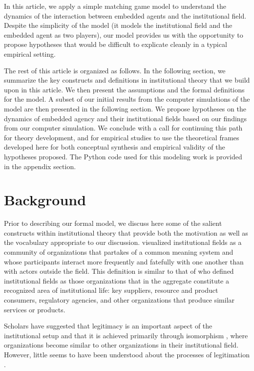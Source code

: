 \documentclass[12pt,letterpaper]{article}
\begin{document}
In this article, we apply a simple matching game model to  understand the dynamics of the interaction between embedded agents and the institutional field. Despite the simplicity of the model (it models the institutional field and the embedded agent as two players), our model provides us with the opportunity to propose hypotheses that would be difficult to explicate cleanly in a typical empirical setting.

The rest of this article is organized as follows. In the following section, we summarize the key constructs and definitions in institutional theory that we build upon in this article. We then present the assumptions and the formal definitions for the model. A subset of our initial results from the computer simulations of the model are then presented in the following section. We propose hypotheses on the dynamics of embedded agency and their institutional fields based on our findings from our computer simulation. We conclude with a call for continuing this path for theory development, and for empirical studies to use the theoretical frames developed here for both conceptual synthesis and empirical validity of the hypotheses proposed. The Python code used for this modeling work is provided in the appendix section.

\section{Background}
Prior to describing our formal model, we discuss here some of the salient constructs within institutional theory that provide both the motivation as well as the vocabulary appropriate to our discussion. \cite{Scott1995} visualized institutional fields as a community of organizations that partakes of a common meaning system and whose participants interact more frequently and fatefully with one another than with actors outside the field. This definition is similar to that of \cite{Dimaggio1983} who defined institutional fields as those organizations that in the aggregate constitute a recognized area of institutional life: key suppliers, resource and product consumers, regulatory agencies, and other organizations that produce similar services or products. 

Scholars have suggested that legitimacy is an important aspect of the institutional setup and that it  is achieved primarily through isomorphism \citep{Kostova2008}, where organizations become similar to other organizations in their institutional field. However, little seems to have been understood about the processes of legitimation \citep{Harmon2015}. 
\end{document}
